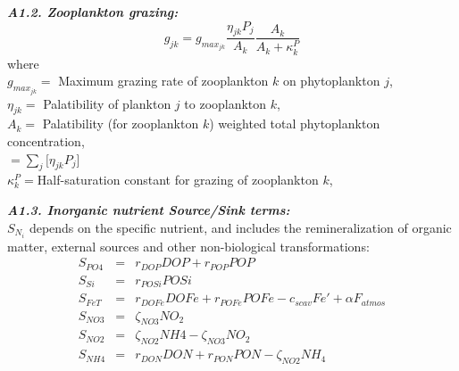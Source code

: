 \documentclass[11pt,letterpaper,english]{article}
\begin{document}
\vspace{.2cm}

{\it {\bf A1.2. Zooplankton grazing:}}\\
\[
 g_{jk} =g_{max_{jk}} \frac{\eta_{jk} P_j}{A_k} \frac{A_k}{A_k+\kappa^P_k}
\]
where\\
\mbox{} \hspace{.5cm} $g_{max_{jk}}=$ Maximum grazing rate of zooplankton $k$ on
phytoplankton $j$,\\
\mbox{} \hspace{.5cm} $\eta_{jk}=$ Palatibility of plankton $j$ to zooplankton $k$,\\
\mbox{} \hspace{.5cm} $A_k=$ Palatibility (for zooplankton $k$) weighted total phytoplankton concentration,\\
\mbox{} \hspace{1.1cm} $=\sum_j [\eta_{jk} P_j$] \\
\mbox{} \hspace{.5cm} $\kappa^P_k=$Half-saturation constant for grazing of zooplankton $k$,\\


\vspace{.2cm}

{\it {\bf A1.3. Inorganic nutrient Source/Sink terms:}}\\
$S_{N_i}$ depends on the specific nutrient, and includes the remineralization
of organic matter, external sources and other non-biological transformations:
\begin{eqnarray}
S_{PO4} & = & r_{DOP} DOP + r_{POP} POP \nonumber \\
S_{Si}  & = & r_{POSi} POSi \nonumber \\
S_{FeT} & = &  r_{DOFe} DOFe + r_{POFe} POFe -c_{scav} Fe' + \alpha F_{atmos} \nonumber \\
S_{NO3} & = &  \zeta_{NO3} NO_2 \nonumber \\
S_{NO2} & = &  \zeta_{NO2} NH4 - \zeta_{NO3} NO_2 \nonumber \\
S_{NH4} & = &  r_{DON} DON + r_{PON} PON - \zeta_{NO2} NH_4 \nonumber
\end{eqnarray}
\end{document}
